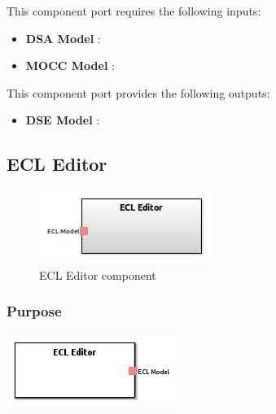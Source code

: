 \documentclass{gemoc} %
\begin{document}
This component port requires the following inputs:
\begin{itemize}
  \item \textbf{DSA Model} :
  \item \textbf{MOCC Model} :
\end{itemize}

This component port provides the following outputs:
\begin{itemize}
  \item \textbf{DSE Model} :
\end{itemize}

\subsection{ECL Editor}

\begin{figure}[htp]
	\begin{center}
	\includegraphics*[trim=0.0cm 0.0cm 0cm 0.0cm, clip=true, scale=1.0]{../images/generated/Generated_ECL Editor.jpg}
	\caption{ECL Editor component}
	\end{center}
\end{figure}

\subsubsection{Purpose}

\begin{center}
\includegraphics*[trim=0.0cm 0.0cm 0cm 0.0cm, clip=true]{../images/generated/Generated_ECL_Editor.png}
\end{center}
\end{document}
